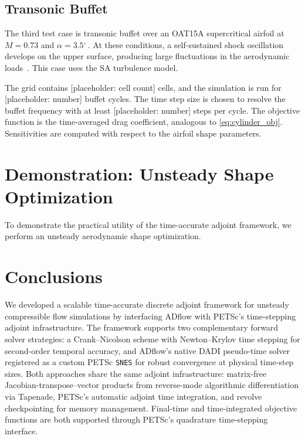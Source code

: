 \documentclass[journal]{new-aiaa}
\newcommand{\degree}{\ensuremath{^\circ\,}}
\begin{document}

\subsection{Transonic Buffet}\label{sec:buffet}
The third test case is transonic buffet over an OAT15A supercritical airfoil at $M = 0.73$ and $\alpha = 3.5\degree$.
At these conditions, a self-sustained shock oscillation develops on the upper surface, producing large fluctuations in the aerodynamic loads~\cite{Crouch2009}.
This case uses the SA turbulence model.

The grid contains [placeholder: cell count] cells, and the simulation is run for [placeholder: number] buffet cycles.
The time step size is chosen to resolve the buffet frequency with at least [placeholder: number] steps per cycle.
The objective function is the time-averaged drag coefficient, analogous to \cref{eq:cylinder_obj}.
Sensitivities are computed with respect to the airfoil shape parameters.


\section{Demonstration: Unsteady Shape Optimization}\label{sec:demonstration}
To demonstrate the practical utility of the time-accurate adjoint framework, we perform an unsteady aerodynamic shape optimization.



\section{Conclusions}\label{sec:conclusions}
We developed a scalable time-accurate discrete adjoint framework for unsteady compressible flow simulations by interfacing ADflow with PETSc's time-stepping adjoint infrastructure.
The framework supports two complementary forward solver strategies: a Crank--Nicolson scheme with Newton--Krylov time stepping for second-order temporal accuracy, and ADflow's native DADI pseudo-time solver registered as a custom PETSc \texttt{SNES} for robust convergence at physical time-step sizes.
Both approaches share the same adjoint infrastructure: matrix-free Jacobian-transpose--vector products from reverse-mode algorithmic differentiation via Tapenade, PETSc's automatic adjoint time integration, and revolve checkpointing for memory management.
Final-time and time-integrated objective functions are both supported through PETSc's quadrature time-stepping interface.
\end{document}
